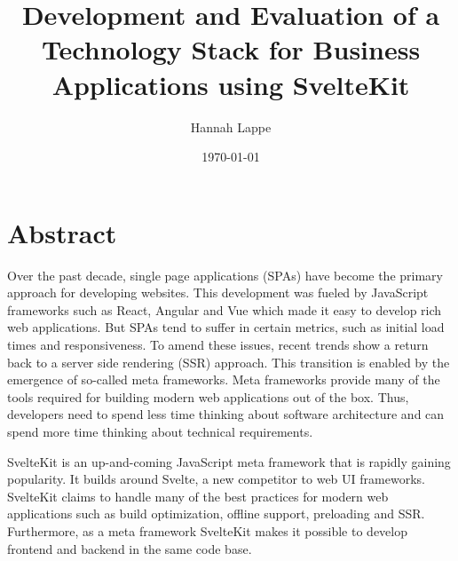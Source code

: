 \documentclass[
a4paper, 
DIV=15, 
headsepline, 
numbers=noenddot,
bibliography=totoc,
BCOR=15mm,
leqno,
]{scrarticle}
\title{Development and Evaluation of a Technology Stack for Business Applications using SvelteKit}
\author{Hannah Lappe}
\date{\today}
\begin{document}
\maketitle

\section*{Abstract}



Over the past decade, single page applications (SPAs) have become the primary approach for developing websites. This development was fueled by JavaScript frameworks such as React, Angular and Vue which made it easy to develop rich web applications. But SPAs tend to suffer in certain metrics, such as initial load times and responsiveness. To amend these issues, recent trends show a return back to a server side rendering (SSR) approach. This transition is enabled by the emergence of so-called meta frameworks. Meta frameworks provide many of the tools required for building modern web applications out of the box. Thus, developers need to spend less time thinking about software architecture and can spend more time thinking about technical requirements.

SvelteKit is an up-and-coming JavaScript meta framework that is rapidly gaining popularity. It builds around Svelte, a new competitor to web UI frameworks. SvelteKit claims to handle many of the best practices for modern web applications such as build optimization, offline support, preloading and SSR. Furthermore, as a meta framework SvelteKit makes it possible to develop frontend and backend in the same code base.
\end{document}
